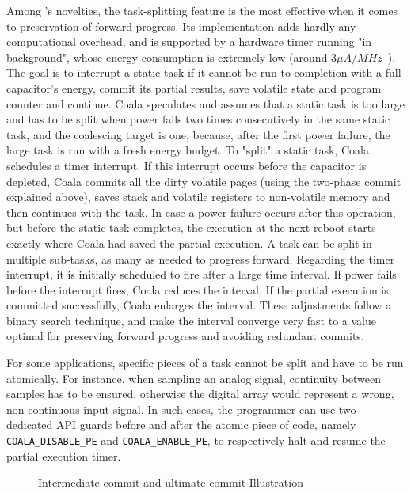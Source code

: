 Among \sys's novelties, the task-splitting feature is the most effective when it comes to preservation of forward progress. Its implementation adds hardly any computational overhead, and is supported by a hardware timer running "in background", whose energy consumption is extremely low (around $3 \mu A/MHz$~\cite{msp430datasheet}). The goal is to interrupt a static task if it cannot be run to completion with a full capacitor's energy, commit its partial results, save volatile state and program counter and continue. Coala speculates and assumes that a static task is too large and has to be split when power fails two times consecutively in the same static task, and the coalescing target is one, because, after the first power failure, the large task is run with a fresh energy budget. To "split" a static task, Coala schedules a timer interrupt. If this interrupt occurs before the capacitor is depleted, Coala commits all the dirty volatile pages (using the two-phase commit explained above), saves stack and volatile registers to non-volatile memory and then continues with the task. In case a power failure occurs after this operation, but before the static task completes, the execution at the next reboot starts exactly where Coala had saved the partial execution. A task can be split in multiple sub-tasks, as many as needed to progress forward. Regarding the timer interrupt, it is initially scheduled to fire after a large time interval. If power fails before the interrupt fires, Coala reduces the interval. If the partial execution is committed successfully, Coala enlarges the interval. These adjustments follow a binary search technique, and make the interval converge very fast to a value optimal for preserving forward progress and avoiding redundant commits.

For some applications, specific pieces of a task cannot be split and have to be run atomically. For instance, when sampling an analog signal, continuity between samples has to be ensured, otherwise the digital array would represent a wrong, non-continuous input signal. In such cases, the programmer can use two dedicated API guards before and after the atomic piece of code, namely \texttt{COALA\_DISABLE\_PE} and \texttt{COALA\_ENABLE\_PE}, to respectively halt and resume the partial execution timer.

\begin{figure}
	\centering
	\caption{Intermediate commit and ultimate commit Illustration }
	\label{fig:intermediate_ultimate-commit}
\end{figure}
